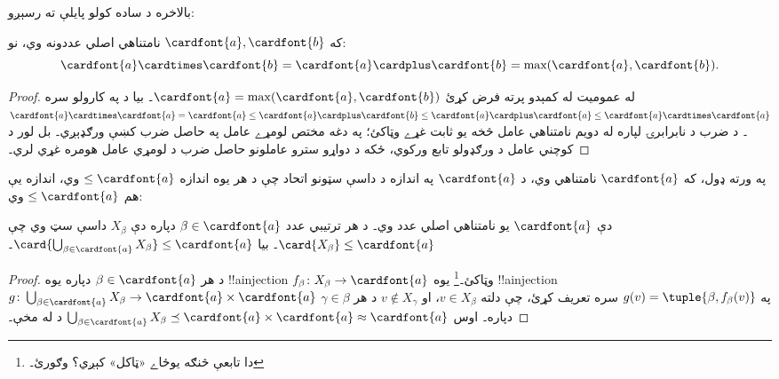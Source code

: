 \documentclass[../../../include/open-logic-section]{subfiles}
\begin{document}
بالاخره د ساده کولو پايلې ته رسېږو:

\begin{thm}
که $\cardfont{a}, \cardfont{b}$ نامتناهي اصلي عددونه وي، نو:
\[
	\cardfont{a}
\cardtimes \cardfont{b} = \cardfont{a} \cardplus \cardfont{b} =
\text{max}(\cardfont{a}, \cardfont{b}).
\]
\end{thm}

\begin{proof}
له عموميت له کمېدو پرته فرض کړئ $\cardfont{a} = \max(\cardfont{a},
\cardfont{b})$۔ بيا د  په کارولو سره
$\cardfont{a}\cardtimes\cardfont{a} = \cardfont{a} \leq \cardfont{a}
\cardplus \cardfont{b} \leq \cardfont{a} \cardplus \cardfont{a} \leq
\cardfont{a} \cardtimes \cardfont{a}$۔ د ضرب د
نابرابرۍ لپاره له دويم نامتناهي عامل څخه يو ثابت غړے
وټاکئ؛ په دغه مختص لومړے عامل په حاصل ضرب کښې ورګډېږي۔
بل لور د کوچني عامل د ورګډولو تابع ورکوي، ځکه د دواړو
سترو عاملونو حاصل ضرب د لومړي عامل هومره غړي لري۔
\end{proof}\noindent په ورته ډول،
که $\cardfont{a}$ نامتناهي وي، د $\cardfont{a}$ په اندازه د
داسې سټونو اتحاد چې د هر يوه اندازه $\leq\cardfont{a}$ وي،
اندازه يې هم $\leq\cardfont{a}$ وي:

\begin{prop}
دې $\cardfont{a}$ يو نامتناهي اصلي عدد وي۔ د هر ترتيبي عدد
$\beta \in \cardfont{a}$ دپاره دې $X_\beta$ داسې سټ وي چې
$\card{X_\beta} \leq \cardfont{a}$۔ بيا
$\card{\bigcup_{\beta \in \cardfont{a}} X_\beta}
\leq \cardfont{a}$۔
\end{prop}

\begin{proof}
د هر $\beta \in \cardfont{a}$ دپاره يوه !!a{injection}
$f_\beta \colon X_\beta \to \cardfont{a}$ وټاکئ۔\footnote{دا تابعې
څنګه يوځاے «ټاکل» کېږي؟ 
وګورئ۔} يوه !!a{injection} $g \colon
\bigcup_{\beta \in \cardfont{a}} X_\beta \to \cardfont{a} \times
\cardfont{a}$ په $g(v) = \tuple{\beta, f_\beta(v)}$ سره تعريف
کړئ، چې دلته $v \in X_\beta$، او $v \notin X_\gamma$ د هر
$\gamma \in \beta$ دپاره۔ اوس
$\bigcup_{\beta \in \cardfont{a}} X_\beta \preceq \cardfont{a} \times
\cardfont{a} \approx \cardfont{a}$ د 
له مخې۔
\end{proof}
\end{document}
